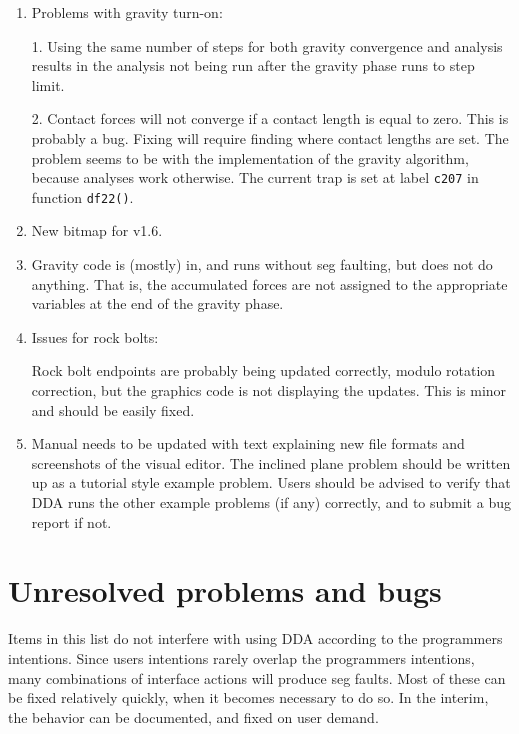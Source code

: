 \documentclass{article}
\begin{document}
\begin{enumerate}

\item Problems with gravity turn-on:

1. Using the same number of steps for both gravity convergence
and analysis results in the analysis not being run after the 
gravity phase runs to step limit.  

2. Contact forces will not converge if a contact length is
equal to zero.   This is probably a bug.  Fixing will require 
finding where contact lengths are set.  The problem seems to
be with the implementation of the gravity algorithm, because
analyses work otherwise.  The current trap is set at 
label {\tt c207} in function {\tt df22()}.

\item New bitmap for v1.6.

\item Gravity code is (mostly) in, and runs without 
seg faulting, but does not do anything.  That is,
the accumulated forces are not assigned to the appropriate
variables at the end of the gravity phase.

\item Issues for rock bolts:

Rock bolt endpoints are probably being updated correctly,
modulo rotation correction,
but the graphics code is not displaying the updates.  This 
is minor and should be easily fixed. 

\item Manual needs to be updated with text explaining new file
formats and screenshots of the visual editor.  The inclined 
plane problem should be written up as a tutorial style
example problem.  Users should be advised to verify that 
DDA runs the other example problems (if any) correctly,
and to submit a bug report if not.


\end{enumerate}


\section*{Unresolved problems and bugs}

Items in this list do not interfere with using DDA according 
to the programmers intentions.  Since users intentions rarely
overlap the programmers intentions, many combinations of 
interface actions will produce seg faults.  Most of these
can be fixed relatively quickly, when it becomes necessary
to do so.  In the interim, the behavior can be documented,
and fixed on user demand.
\end{document}
